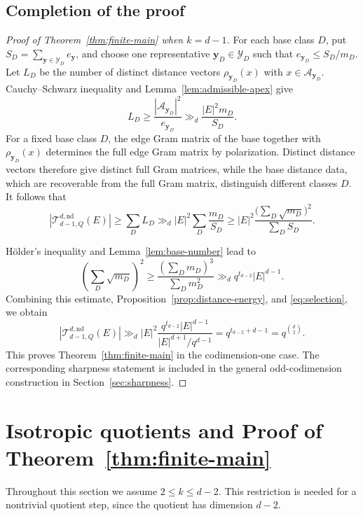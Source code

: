 \documentclass[11pt]{article}
\theoremstyle{remark}
\numberwithin{equation}{section}
\newcommand{\cT}{\mathcal T}
\newcommand{\cY}{\mathcal Y}
\newcommand{\cA}{\mathcal A}
\newcommand{\1}{\mathbf 1}
\begin{document}
\subsection{Completion of the proof}

\begin{proof}[Proof of Theorem~\ref{thm:finite-main} when
\(k=d-1\)]
For each base class \(D\), put $S_D  = \sum_{\mathbf y\in\cY_D}e_{\mathbf y}$, and choose one representative \(\mathbf y_D\in\cY_D\) such that $e_{\mathbf y_D} \le S_D/m_D$. Let \(L_D\) be the number of distinct distance vectors $\rho_{\mathbf y_D}(x)$ with $x\in\cA_{\mathbf y_D}$. Cauchy--Schwarz inequality and Lemma~\ref{lem:admissible-apex} give
\[
 L_D
 \ge 
 \frac{|\cA_{\mathbf y_D}|^2}{e_{\mathbf y_D}}
 \gg_d
 \frac{|E|^2m_D}{S_D}.
\]
For a fixed base class \(D\), the edge Gram matrix of the base together with \(\rho_{\mathbf y_D}(x)\) determines the full edge Gram matrix by polarization. Distinct distance vectors therefore give distinct full Gram matrices, while the base distance data, which are recoverable from the full Gram matrix, distinguish different classes \(D\).
It follows that
\begin{equation}\label{eq:selection}
 |\cT^{d,\mathrm{nd}}_{d-1,Q}(E)|\geq \sum_D L_D
 \gg_d
 |E|^2\sum_D\frac{m_D}{S_D}
 \ge
 |E|^2
 \frac{\bigl(\sum_D\sqrt{m_D}\bigr)^2}
      {\sum_DS_D}.
\end{equation}

H\"older's inequality and Lemma~\ref{lem:base-number} lead to
\[
 \left(\sum_D\sqrt{m_D}\right)^2
 \ge
 \frac{\left(\sum_Dm_D\right)^3}
      {\sum_Dm_D^2}\gg_d
 q^{t_{d-2}}|E|^{d-1}.
\]
Combining this estimate, Proposition~\ref{prop:distance-energy}, and \eqref{eq:selection}, we obtain
\[
 |\cT^{d,\mathrm{nd}}_{d-1,Q}(E)|
 \gg_d
 |E|^2\frac{q^{t_{d-2}}|E|^{d-1}}
      {|E|^{d+1}/q^{d-1}}
 =
 q^{t_{d-2}+d-1}
 =
 q^{\binom d2}.
\]
This proves Theorem~\ref{thm:finite-main} in the codimension-one case. The corresponding sharpness statement is included in the general odd-codimension construction in Section~\ref{sec:sharpness}.
\end{proof}

\section{Isotropic quotients and Proof of Theorem~\ref{thm:finite-main}}
\label{sec:quotient}

Throughout this section we assume \(2\le k\le d-2\). This restriction is needed for a nontrivial quotient step, since the quotient has dimension \(d-2\). %
\end{document}
